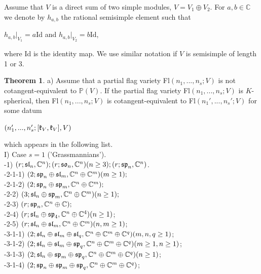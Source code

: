 \documentclass[12pt]{amsart}
\theoremstyle{definition}\newtheorem{theorem}{Theorem}[section]
\theoremstyle{definition}\newtheorem{definition}[proposition]{Definition}
\theoremstyle{remark}\newtheorem{example}[proposition]{Example}
\newcounter{AP}
\begin{document}
Assume that $V$ is a direct sum of two simple modules, $V=V_1\oplus V_2$. For $a,b\in\mathbb C$ we denote by $h_{a,b}$ the rational semisimple element such that \begin{center}$h_{a,b}|_{V_1}=a$Id and $h_{a,b}|_{V_2}=b$Id,\end{center} where Id is the identity map. We use similar notation if $V$ is semisimple of length 1 or 3.
\begin{theorem}\label{KlGr}a) Assume that a partial flag variety Fl$(n_1,..., n_s; V)$ is not cotangent-equivalent to $\mathbb P(V)$. If the partial flag variety Fl$(n_1,...,n_s; V)$ is $K$-spherical, then Fl$(n_1,..., n_s; V)$ is cotangent-equivalent to Fl$(n_1',...,n_s'; V)$ for some datum \begin{center}$(n_1',...,n_s'; [\frak k_V, \frak k_V], V)$\end{center} which appears in the following list.\\
\setcounter{AP}{1}I) Case $s=1$ ('Grassmannians').\\
-1) $(r; \frak{sl}_n, \mathbb C^n); (r; \frak{so}_n, \mathbb C^n) (n\ge 3); (r; \frak{sp}_n, \mathbb C^n)$.\\
-2-1-1) $(2; \frak{sp}_n\oplus\frak{sl}_m, \mathbb C^n\oplus\mathbb C^m) (m\ge1);$\\
-2-1-2) $(2; \frak{sp}_n\oplus\frak{sp}_m, \mathbb C^n\oplus\mathbb C^m);$\\
-2-2) $(3; \frak{sl}_n\oplus\frak{sp}_m, \mathbb C^n\oplus\mathbb C^m) ( n\ge 1);$\\
-2-3) $(r; \frak{sp}_n, \mathbb C^n\oplus\mathbb C);$\\
-2-4) $(r; \frak{sl}_n\oplus\frak{sp}_4, \mathbb C^n\oplus\mathbb C^4) (n\ge 1)$;\\
-2-5) $(r; \frak{sl}_n\oplus\frak{sl}_m, \mathbb C^n\oplus\mathbb C^m) (n,m\ge 1)$;\\
-3-1-1) $(2; \frak{sl}_n\oplus\frak{sl}_m\oplus\frak{sl}_q, \mathbb C^n\oplus\mathbb C^m\oplus\mathbb C^q) (m,n,q\ge 1)$;\\
-3-1-2) $(2; \frak{sl}_n\oplus\frak{sl}_m\oplus\frak{sp}_q, \mathbb C^n\oplus\mathbb C^m\oplus\mathbb C^q) ( m\ge 1, n\ge 1)$;\\
-3-1-3) $(2; \frak{sl}_n\oplus\frak{sp}_m\oplus\frak{sp}_q,\mathbb C^n\oplus\mathbb C^m\oplus\mathbb C^q) ( n\ge 1)$;\\
-3-1-4) $(2; \frak{sp}_n\oplus\frak{sp}_m\oplus\frak{sp}_q, \mathbb C^n\oplus\mathbb C^m\oplus\mathbb C^q)$;\\

\end{theorem}
\end{document}
